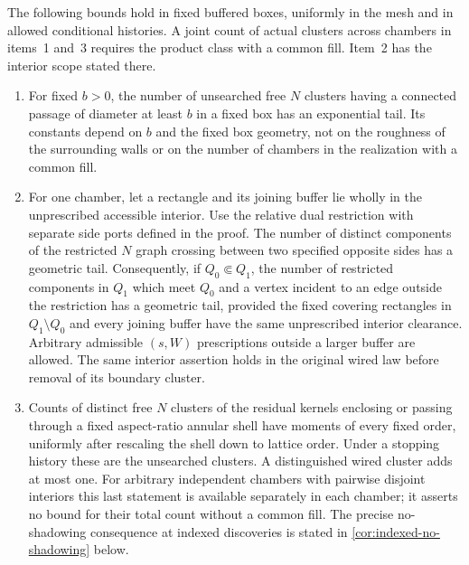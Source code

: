 \begin{proposition}
\label{prop:cluster-counts}
The following bounds hold in fixed buffered boxes, uniformly in the
mesh and in allowed conditional histories. A joint count of actual
clusters across chambers in items~1 and~3 requires the product class
with a common fill. Item~2 has the interior scope stated there.
\begin{enumerate}
\item For fixed $b>0$, the number of unsearched free $N$ clusters
having a connected passage of diameter at least $b$ in a fixed box
has an exponential tail. Its constants depend on $b$ and the fixed
box geometry, not on the roughness of the surrounding walls or on
the number of chambers in the realization with a common fill.
\item For one chamber, let a rectangle and its joining buffer lie
wholly in the unprescribed accessible interior. Use the relative dual
restriction with separate side ports defined in the proof. The number of distinct
components of the restricted $N$ graph crossing between two specified
opposite sides has a geometric tail. Consequently, if
$Q_0\Subset Q_1$, the number of restricted components in $Q_1$
which meet $Q_0$ and a vertex incident to an edge outside the
restriction has a geometric tail, provided the fixed covering
rectangles in $Q_1\setminus Q_0$ and every joining buffer have the
same unprescribed interior clearance. Arbitrary admissible $(s,W)$
prescriptions outside a larger buffer are allowed. The same interior
assertion holds in the original wired law before removal of its
boundary cluster.
\item Counts of distinct free $N$ clusters of the residual kernels
enclosing or passing through a fixed
aspect-ratio annular shell have moments of every fixed order, uniformly
after rescaling the shell down to lattice order. Under a stopping
history these are the unsearched clusters. A distinguished wired
cluster adds at most one. For arbitrary
independent chambers with pairwise disjoint interiors this last
statement is available separately in each chamber; it asserts no
bound for their total count without a common fill. The precise
no-shadowing consequence at indexed discoveries is stated in
\cref{cor:indexed-no-shadowing} below.
\end{enumerate}
\end{proposition}

